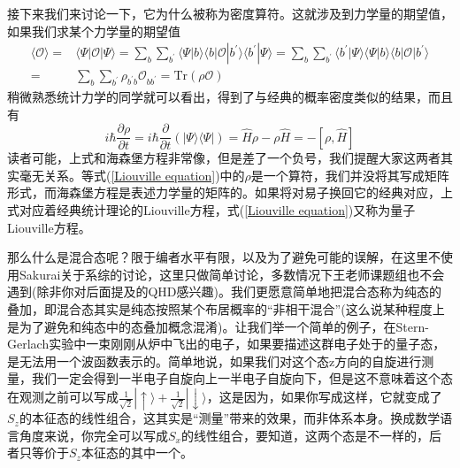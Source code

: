 \documentclass[12pt,a4paper,openany,twoside]{book}
\numberwithin{equation}{section}
\begin{document}
  接下来我们来讨论一下，它为什么被称为密度算符。这就涉及到力学量的期望值，如果我们求某个力学量的期望值
  \begin{equation}
    \begin{aligned}
      \langle\mathcal{O}\rangle=&\langle \Psi | \mathcal{O} | \Psi \rangle=\sum_{b}\sum_{b^\prime} \langle \Psi | b \rangle \langle b | \mathcal{O} | b^\prime \rangle \langle b^\prime | \Psi \rangle=\sum_{b}\sum_{b^\prime} \langle b^\prime | \Psi \rangle \langle \Psi | b \rangle \langle b | \mathcal{O} | b^\prime \rangle \\=&\sum_{b}\sum_{b^\prime}\rho_{b^\prime b}\mathcal{O}_{b b^\prime}=\text{Tr}(\rho \mathcal{O})
    \end{aligned}
  \end{equation}
  稍微熟悉统计力学的同学就可以看出，得到了与经典的概率密度类似的结果，而且有
  \begin{equation}
    i \hbar \frac{\partial \rho}{\partial t}=i \hbar \frac{\partial}{\partial t} \left(| \Psi \rangle \langle \Psi |\right)=\hat{H}\rho-\rho\hat{H}=-\left[\rho,\hat{H}\right]
    \label{Liouville equation}
  \end{equation}
  读者可能，上式和海森堡方程非常像，但是差了一个负号，我们提醒大家这两者其实毫无关系。等式(\ref{Liouville equation})中的$\rho$是一个算符，我们并没将其写成矩阵形式，而海森堡方程是表述力学量的矩阵的。如果将对易子换回它的经典对应，上式对应着经典统计理论的Liouville方程，式(\ref{Liouville equation})又称为量子Liouville方程。

  那么什么是混合态呢？限于编者水平有限，以及为了避免可能的误解，在这里不使用Sakurai关于系综的讨论\cite{J.J.Sakurai2010}，这里只做简单讨论，多数情况下王老师课题组也不会遇到(除非你对后面提及的QHD感兴趣)。我们更愿意简单地把混合态称为纯态的叠加，即混合态其实是纯态按照某个布居概率的“非相干混合”(这么说某种程度上是为了避免和纯态中的态叠加概念混淆)。让我们举一个简单的例子，在Stern-Gerlach实验中一束刚刚从炉中飞出的电子，如果要描述这群电子处于的量子态，是无法用一个波函数表示的。简单地说，如果我们对这个态z方向的自旋进行测量，我们一定会得到一半电子自旋向上一半电子自旋向下，但是这不意味着这个态在观测之前可以写成$\frac{1}{\sqrt{2}} | \uparrow \rangle +\frac{1}{\sqrt{2}} | \downarrow \rangle$，这是因为，如果你写成这样，它就变成了$S_z$的本征态的线性组合，这其实是“测量”带来的效果，而非体系本身。换成数学语言角度来说，你完全可以写成$S_x$的线性组合，要知道，这两个态是不一样的，后者只等价于$S_z$本征态的其中一个。
\end{document}

